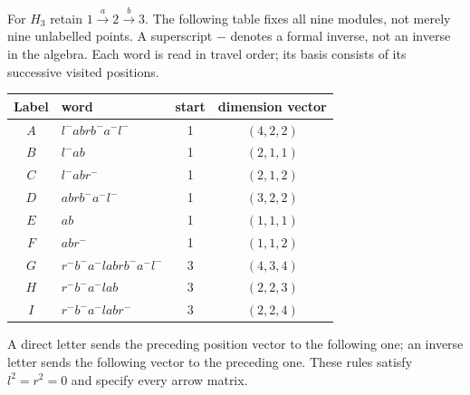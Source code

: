 For $H_3$ retain $1\xrightarrow a2\xrightarrow b3$. The following table fixes
all nine modules, not merely nine unlabelled points. A superscript $-$ denotes
a formal inverse, not an inverse in the algebra. Each word is read in travel
order; its basis consists of its successive visited positions.
\begin{center}\small
\begin{tabular}{c l c c}
\toprule Label&word&start&dimension vector\\\midrule
$A$&$l^-abrb^-a^-l^-$&1&$(4,2,2)$\\
$B$&$l^-ab$&1&$(2,1,1)$\\
$C$&$l^-abr^-$&1&$(2,1,2)$\\
$D$&$abrb^-a^-l^-$&1&$(3,2,2)$\\
$E$&$ab$&1&$(1,1,1)$\\
$F$&$abr^-$&1&$(1,1,2)$\\
$G$&$r^-b^-a^-labrb^-a^-l^-$&3&$(4,3,4)$\\
$H$&$r^-b^-a^-lab$&3&$(2,2,3)$\\
$I$&$r^-b^-a^-labr^-$&3&$(2,2,4)$\\\bottomrule
\end{tabular}
\end{center}
A direct letter sends the preceding position vector to the following one;
an inverse letter sends the following vector to the preceding one. These rules
satisfy $l^2=r^2=0$ and specify every arrow matrix.

